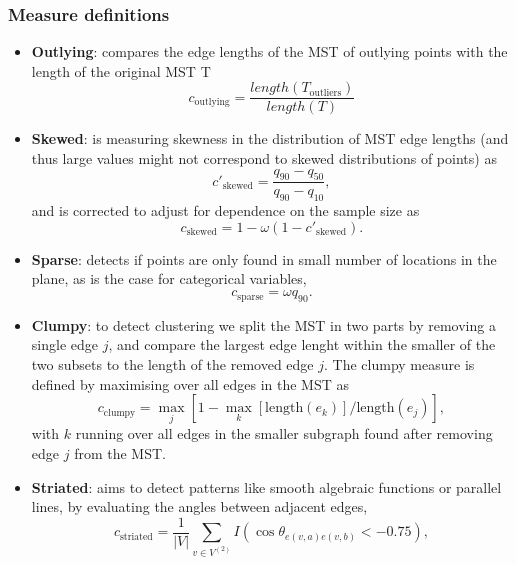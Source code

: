 \hypertarget{measure-definitions}{%
\subsubsection{Measure definitions}\label{measure-definitions}}

\begin{itemize}
\tightlist
\item
  \textbf{Outlying}: compares the edge lengths of the MST of outlying
  points with the length of the original MST T \begin{equation}
  c_{\mathrm{outlying}} = \frac{length(T_{\mathrm{outliers}})}{length(T)}
  \end{equation}
\item
  \textbf{Skewed}: is measuring skewness in the distribution of MST edge
  lengths (and thus large values might not correspond to skewed
  distributions of points) as \begin{equation}
  c'_{\mathrm{skewed}} = \frac{q_{90}-q_{50}}{q_{90}-q_{10}},
  \end{equation} and is corrected to adjust for dependence on the sample
  size as \begin{equation}
  c_{\mathrm{skewed}} = 1 - \omega (1 - c'_{\mathrm{skewed}}).
  \end{equation}
\item
  \textbf{Sparse}: detects if points are only found in small number of
  locations in the plane, as is the case for categorical variables,
  \begin{equation}
  c_{\mathrm{sparse}} = \omega q_{90}.
  \end{equation}
\item
  \textbf{Clumpy}: to detect clustering we split the MST in two parts by
  removing a single edge \(j\), and compare the largest edge lenght
  within the smaller of the two subsets to the length of the removed
  edge \(j\). The clumpy measure is defined by maximising over all edges
  in the MST as \begin{equation}
  c_{\mathrm{clumpy}} = \max_j [1 - \max_k[\mathrm{length}(e_k)] / \mathrm{length}(e_j) ],
  \end{equation} with \(k\) running over all edges in the smaller
  subgraph found after removing edge \(j\) from the MST.
\item
  \textbf{Striated}: aims to detect patterns like smooth algebraic
  functions or parallel lines, by evaluating the angles between adjacent
  edges, \begin{equation}
  c_{\mathrm{striated}} = \frac{1}{|V|} \sum_{v\in V^{(2)}} I(\cos\theta_{e(v,a)e(v,b)} < -0.75),

\end{equation}
\end{itemize}
